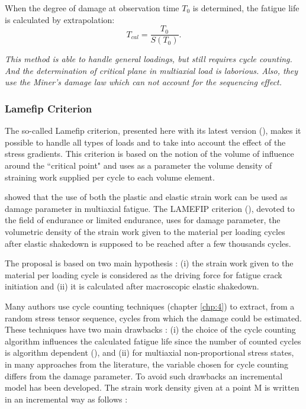When the degree of damage at observation time $T_0$ is
determined, the fatigue life is calculated by extrapolation:
$$T_{cal}=\dfrac{T_0}{S(T_0)}.$$

\textit{This method is able to handle general loadings, but still requires cycle counting. And the determination of critical plane in multiaxial load is laborious. Also, they use the Miner's damage law which can not account for the sequencing effect.}

\subsubsection{Lamefip Criterion}
The so-called Lamefip criterion, presented here with its latest version (\cite{benabes2006approche}), makes it possible to handle all types of loads and to take into account the effect of the stress gradients. This criterion is based on the notion of the volume of influence around the ``critical point" and uses as a parameter the volume density of straining work supplied per cycle to each volume element.

\cite{ellyin2012fatigue} showed that the use of both the plastic and elastic strain work can be used
as damage parameter in multiaxial fatigue. The LAMEFIP criterion (\cite{banvillet2003volumetric}),
devoted to the field of endurance or limited endurance, uses for damage parameter, the volumetric density of the strain work given to the material per loading cycles after elastic shakedown is supposed to be reached after a few thousands cycles.

The proposal is based on two main hypothesis : (i) the strain work given to the material per loading cycle is considered as the driving force for fatigue crack initiation and (ii) it is calculated after macroscopic elastic shakedown.

Many authors use cycle counting techniques (chapter \ref{chp:4}) to extract, from a random stress tensor sequence, cycles from which the damage could be estimated. These techniques have two main drawbacks : (i) the choice of the cycle counting algorithm influences the calculated fatigue life since the number of counted cycles is algorithm dependent (\cite{dowling1983fatigue}), and (ii) for multiaxial non-proportional stress states, in many approaches from the literature, the variable chosen for cycle counting differs from the damage parameter. To avoid such drawbacks an incremental model has been developed. The strain work density given at a point M is written in an incremental way as follows :

